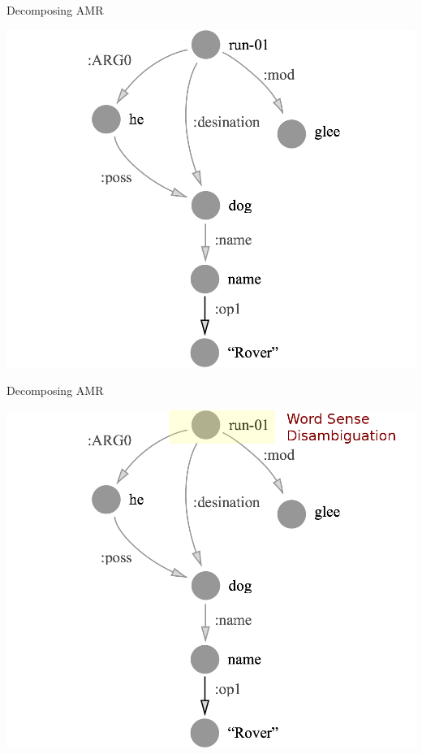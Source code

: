 \documentclass[hyperref]{beamer}
\begin{document}
\begin{frame}{Decomposing AMR}
\begin{center}
\includegraphics[scale=0.25]{glee_base.png}
\end{center}
\end{frame}

\begin{frame}[noframenumbering]{Decomposing AMR}
\begin{center}
\includegraphics[scale=0.25]{glee_wsd.png}
\end{center}
\end{frame}
\end{document}
